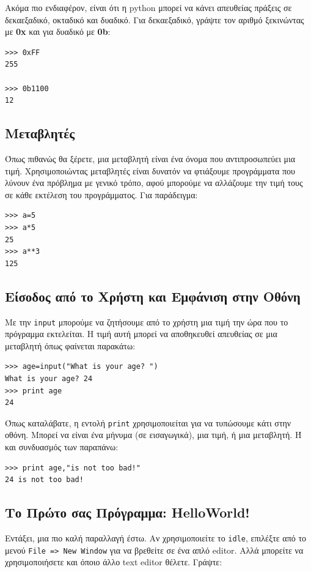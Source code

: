 Ακόμα πιο ενδιαφέρον, είναι ότι η python μπορεί να κάνει απευθείας πράξεις
σε δεκαεξαδικό, οκταδικό και δυαδικό. Για δεκαεξαδικό, γράψτε τον αριθμό
ξεκινώντας με {\bf 0x} και για δυαδικό με {\bf 0b}:

\begin{verbatim}
>>> 0xFF
255

>>> 0b1100
12
\end{verbatim}
%
\subsection{Μεταβλητές}
%
Όπως πιθανώς θα ξέρετε, μια μεταβλητή είναι ένα όνομα που αντιπροσωπεύει μια
τιμή. Χρησιμοποιώντας μεταβλητές είναι δυνατόν να φτιάξουμε προγράμματα που
λύνουν ένα πρόβλημα με γενικό τρόπο, αφού μπορούμε να αλλάζουμε την τιμή
τους σε κάθε εκτέλεση του προγράμματος. Για παράδειγμα:

\begin{verbatim}
>>> a=5
>>> a*5
25
>>> a**3
125
\end{verbatim}
%
\subsection{Είσοδος από το Χρήστη και Εμφάνιση στην Οθόνη}
%
Με την {\tt input} μπορούμε να ζητήσουμε από το χρήστη μια τιμή την ώρα που το
πρόγραμμα εκτελείται. Η τιμή αυτή μπορεί να αποθηκευθεί απευθείας σε μια
μεταβλητή όπως φαίνεται παρακάτω:

\begin{verbatim}
>>> age=input("What is your age? ")
What is your age? 24
>>> print age
24
\end{verbatim}

Όπως καταλάβατε, η εντολή {\tt print} χρησιμοποιείται για να τυπώσουμε κάτι στην
οθόνη. Μπορεί να είναι ένα μήνυμα (σε εισαγωγικά), μια τιμή, ή μια
μεταβλητή. Ή και συνδυασμός των παραπάνω:

\begin{verbatim}
>>> print age,"is not too bad!"
24 is not too bad!
\end{verbatim}
%
\subsection{Το Πρώτο σας Πρόγραμμα: HelloWorld!}
%
Εντάξει, μια πιο καλή παραλλαγή έστω. Αν χρησιμοποιείτε το {\tt idle}, επιλέξτε
από το μενού {\tt File => New Window} για να βρεθείτε σε ένα απλό editor. Αλλά
μπορείτε να χρησιμοποιήσετε και όποιο άλλο text editor θέλετε. Γράψτε:

